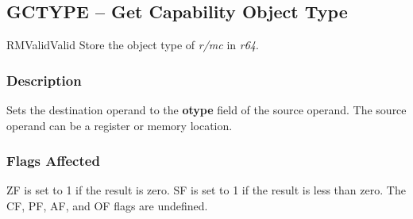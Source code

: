 \clearpage
{}
{}
\subsection*{GCTYPE -- Get Capability Object Type}

\begin{x86opcodetable}
  {RM}{Valid}{Valid}
  {Store the object type of \emph{r/mc} in \emph{r64}.}
\end{x86opcodetable}

\begin{x86opentable}
\end{x86opentable}

\subsubsection*{Description}

Sets the destination operand to the \textbf{otype} field of the source
operand.  The source operand can be a register or memory location.

\subsubsection*{Flags Affected}

ZF is set to 1 if the result is zero.  SF is set to 1 if the result is
less than zero. The CF, PF, AF, and OF flags are undefined.
